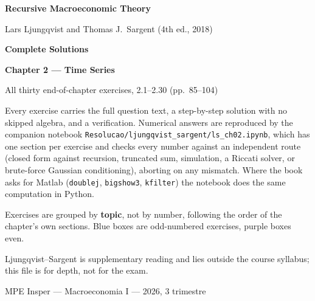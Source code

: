 \documentclass[12pt, letterpaper]{article}
\begin{document}
\begin{titlepage}
\centering
\vspace*{2.5cm}
{\Huge\bfseries\color{darkblue} Recursive Macroeconomic Theory\par}
\vspace{6pt}
{\large Lars Ljungqvist and Thomas J.\ Sargent (4th ed., 2018)\par}
\vspace{1.4cm}
{\LARGE\bfseries Complete Solutions\par}
\vspace{6pt}
{\LARGE\bfseries Chapter 2 --- Time Series\par}
\vspace{1.2cm}
{\large All thirty end-of-chapter exercises, 2.1--2.30 (pp.~85--104)\par}
\vspace{2cm}

\begin{tcolorbox}[theorybox,title={What is in this file},width=0.86\textwidth]
\small
Every exercise carries the full question text, a step-by-step solution with no skipped
algebra, and a verification. Numerical answers are reproduced by the companion notebook
\texttt{Resolucao/ljungqvist\_sargent/ls\_ch02.ipynb}, which has one section per exercise and
checks every number against an independent route (closed form against recursion, truncated
sum, simulation, a Riccati solver, or brute-force Gaussian conditioning), aborting on any
mismatch. Where the book asks for Matlab (\texttt{doublej}, \texttt{bigshow3}, \texttt{kfilter})
the notebook does the same computation in Python.

\smallskip
Exercises are grouped by \textbf{topic}, not by number, following the order of the
chapter's own sections. Blue boxes are odd-numbered exercises, purple boxes even.

\smallskip
Ljungqvist--Sargent is supplementary reading and lies outside the course syllabus; this file is
for depth, not for the exam.
\end{tcolorbox}

\vfill
{\small MPE Insper --- Macroeconomia I --- 2026, 3\textordmasculine{} trimestre\par}
\end{titlepage}

\tableofcontents
\newpage
\end{document}
